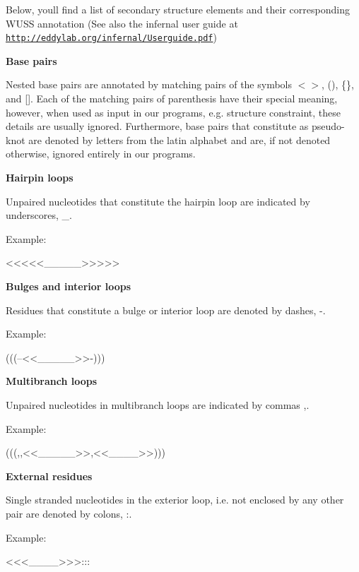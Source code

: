 Below, you\textquotesingle{}ll find a list of secondary structure elements and their corresponding W\+U\+SS annotation (See also the infernal user guide at \href{http://eddylab.org/infernal/Userguide.pdf}{\tt http\+://eddylab.\+org/infernal/\+Userguide.\+pdf})


\begin{DoxyItemize}
\item {\bfseries Base pairs}

Nested base pairs are annotated by matching pairs of the symbols {\ttfamily $<$$>$}, {\ttfamily ()}, {\ttfamily \{\}}, and {\ttfamily \mbox{[}\mbox{]}}. Each of the matching pairs of parenthesis have their special meaning, however, when used as input in our programs, e.\+g. structure constraint, these details are usually ignored. Furthermore, base pairs that constitute as pseudo-\/knot are denoted by letters from the latin alphabet and are, if not denoted otherwise, ignored entirely in our programs.
\item {\bfseries Hairpin loops}

Unpaired nucleotides that constitute the hairpin loop are indicated by underscores, {\ttfamily \+\_\+}.

Example\+:
\begin{DoxyCode}
<<<<<\_\_\_\_\_>>>>>
\end{DoxyCode}

\item {\bfseries Bulges and interior loops}

Residues that constitute a bulge or interior loop are denoted by dashes, {\ttfamily -\/}.

Example\+:
\begin{DoxyCode}
(((--<<\_\_\_\_\_>>-)))
\end{DoxyCode}

\item {\bfseries Multibranch loops}

Unpaired nucleotides in multibranch loops are indicated by commas {\ttfamily ,}.

Example\+:
\begin{DoxyCode}
(((,,<<\_\_\_\_\_>>,<<\_\_\_\_>>)))
\end{DoxyCode}

\item {\bfseries External residues}

Single stranded nucleotides in the exterior loop, i.\+e. not enclosed by any other pair are denoted by colons, {\ttfamily \+:}.

Example\+:
\begin{DoxyCode}
<<<\_\_\_\_>>>:::
\end{DoxyCode}


\end{DoxyItemize}
